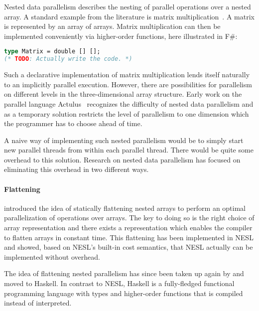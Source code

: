 \documentclass[a4paper]{article}
\begin{document}
Nested data parallelism describes the nesting of parallel operations
over a nested array. A standard example from the literature is matrix
multiplication~\cite{Keller:2010:RSP:1863543.1863582}. A matrix is
represented by an array of arrays. Matrix multiplication can then be
implemented conveniently via higher-order functions, here illustrated
in F\#:

\begin{lstlisting}[language=ML]
type Matrix = double [] [];
(* TODO: Actually write the code. *)
\end{lstlisting}

Such a declarative implementation of matrix multiplication lends
itself naturally to an implicitly parallel execution. However, there
are possibilities for parallelism on different levels in the
three-dimensional array structure. Early work on the parallel language
Actulus~\cite{Perrott:1979:LAV:357073.357075} recognizes the
difficulty of nested data parallelism and as a temporary solution
restricts the level of parallelism to one dimension which the
programmer has to choose ahead of time.

A naive way of implementing such nested parallelism would be to simply
start new parallel threads from within each parallel thread. There
would be quite some overhead to this solution. Research on nested data
parallelism has focused on eliminating this overhead in two different
ways.

\paragraph{Flattening}

\citet{Blelloch1993Implementation} introduced the idea of statically
flattening nested arrays to perform an optimal parallelization of
operations over arrays. The key to doing so is the right choice of
array representation and there exists a representation which enables
the compiler to flatten arrays in constant time. This flattening has
been implemented in NESL and \citet{Blelloch:1996:PTS:232627.232650}
showed, based on NESL's built-in cost semantics, that NESL actually
can be implemented without overhead.

The idea of flattening nested parallelism has since been taken up
again by \citet{Lippmeier:2012:WEH:2364527.2364564} and moved to
Haskell. In contrast to NESL, Haskell is a fully-fledged functional
programming language with types and higher-order functions that is
compiled instead of interpreted.
\end{document}
